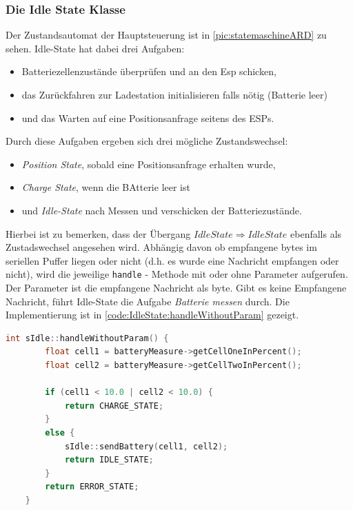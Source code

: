 \subsubsection{Die Idle State Klasse}
\label{sec:IdleState}
Der Zustandsautomat der Hauptsteuerung ist in \autoref{pic:statemaschineARD} zu sehen.
Idle-State hat dabei drei Aufgaben:
\begin{center}
	\begin{itemize}
		\item Batteriezellenzustände überprüfen und an den Esp schicken,
		\item das Zurückfahren zur Ladestation initialisieren falls nötig (Batterie leer)
		\item und das Warten auf eine Positionsanfrage seitens des ESPs.
	\end{itemize}
\end{center}
 Durch diese Aufgaben ergeben sich drei mögliche Zustandswechsel:
 \begin{center}
	\begin{itemize}
		\item \textit{Position State}, sobald eine Positionsanfrage erhalten wurde,
		\item \textit{Charge State}, wenn die BAtterie leer ist
		\item und \textit{Idle-State} nach Messen und verschicken der Batteriezustände.
	\end{itemize}
\end{center}
Hierbei ist zu bemerken, dass der Übergang $Idle State \Rightarrow  Idle State$ ebenfalls als Zustadswechsel angesehen wird.
Abhängig davon ob empfangene bytes im seriellen Puffer liegen oder nicht (d.h. es wurde eine Nachricht empfangen oder nicht), wird die jeweilige \texttt{handle} - Methode mit oder ohne Parameter aufgerufen. Der Parameter ist die empfangene Nachricht als byte.
Gibt es keine Empfangene Nachricht, führt Idle-State die Aufgabe \textit{Batterie messen} durch. Die Implementierung ist in \autoref{code:IdleState:handleWithoutParam} gezeigt.
\newpage
\begin{lstlisting}[language=c, style=dhpaperdefault]
	int sIdle::handleWithoutParam() {
		float cell1 = batteryMeasure->getCellOneInPercent();
		float cell2 = batteryMeasure->getCellTwoInPercent();

		if (cell1 < 10.0 | cell2 < 10.0) {
			return CHARGE_STATE;
		}
		else {
			sIdle::sendBattery(cell1, cell2);
			return IDLE_STATE;
		}
		return ERROR_STATE;
	}
\end{lstlisting}
